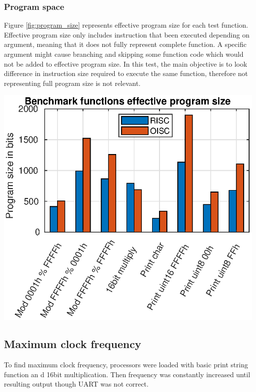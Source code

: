 \subsubsection{Program space}

Figure \ref{fig:program_size} represents effective program size for each test function. Effective program size only includes instruction that been executed depending on argument, meaning that it does not fully represent complete function. A specific argument might cause branching and skipping some function code which would not be added to effective program size. In this test, the main objective is to look difference in instruction size required to execute the same function, therefore not representing full program size is not relevant. 
\begin{colfigure}
	\centering
	\includegraphics[width=\linewidth]{../tests/program_size.eps}
	\label{fig:program_size}
\end{colfigure}

\subsection{Maximum clock frequency}
To find maximum clock frequency, processors were loaded with basic print string function an d 16bit multiplication. Then frequency was constantly increased until resulting output though UART was not correct. 

